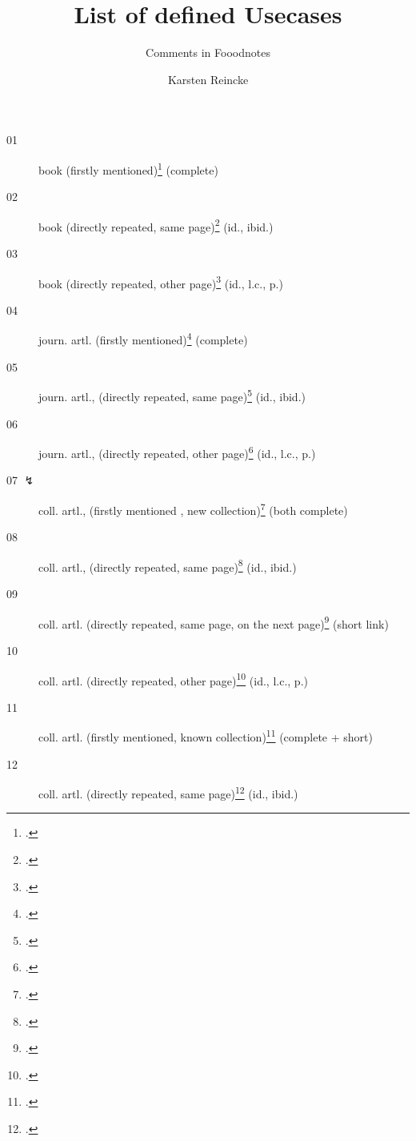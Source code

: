 \documentclass[
  DIV=calc,
  BCOR=5mm,
  11pt,
  smallheadings,
  oneside,
  abstract=true,
  toc=bib,
  ngerman,english]{scrartcl}
\begin{document}
\nocite{*}

\titlehead{mycsrf.verify-: English}
\subject{(scholar-) Scientific Texts Based on a Modified\textit{jurabib}}
\title{List of defined Usecases}
\subtitle{Comments in Fooodnotes}
\author{Karsten Reincke}

\maketitle


\begin{description}

  \item[01 \checkmark] book 
    (firstly  mentioned)\footcite[vgl.][12]{KantKdU1974} (complete) 
  \item[02 \checkmark] book (directly repeated,
      same page)\footcite[vgl.][12]{KantKdU1974} (id., ibid.)
  \item[03 \checkmark] book (directly repeated, 
      other page)\footcite[vgl.][13]{KantKdU1974} (id., l.c., p.)
  \item[04 \checkmark] journ. artl.
    (firstly  mentioned)\footcite[vgl.][12]{McCarthy1980a} (complete)
  \item[05 \checkmark] journ. artl., (directly repeated,
       same page)\footcite[vgl.][12]{McCarthy1980a} (id., ibid.)
  \item[06 \checkmark] journ. artl., (directly repeated,
       other page)\footcite[vgl.][13]{McCarthy1980a} (id., l.c., p.)
  
  \item[07 $\lightning$] coll. artl., (firstly  mentioned , 
      new collection)\footcite[vgl.][12]{Hays1985a} (both complete)
  \item[08 \checkmark] coll. artl., (directly repeated,
      same page)\footcite[vgl.][12]{Hays1985a} (id., ibid.)
      
 \item[09 \checkmark] coll. artl. (directly repeated,
      same page, on the next page)\footcite[vgl.][12]{Hays1985a} (short link)
  \item[10 \checkmark]  coll. artl. (directly repeated,
      other page)\footcite[vgl.][13]{Hays1985a} (id., l.c., p.)
       
  \item[11 \checkmark] coll. artl. (firstly  mentioned,
      known collection)\footcite[vgl.][12]{DaBu1985a} (complete + short)
  \item[12 \checkmark] coll. artl. (directly repeated,
      same page)\footcite[vgl.][12]{DaBu1985a} (id., ibid.)


\end{description}
\end{document}
